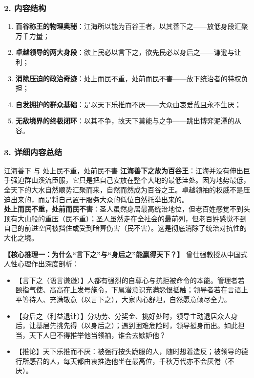 \subsubsection{2. 内容结构}
\begin{enumerate}
    \item \textbf{百谷称王的物理奥秘}：江海所以能为百谷王者，以其善下之——放低身段汇聚万千力量；
    \item \textbf{卓越领导的两大身段}：欲上民必以言下之，欲先民必以身后之——谦逊与让利；
    \item \textbf{消除压迫的政治奇迹}：处上而民不重，处前而民不害——放下统治者的特权负担；
    \item \textbf{自发拥护的群众基础}：是以天下乐推而不厌——大众由衷爱戴且永不生厌；
    \item \textbf{无敌境界的终极闭环}：以其不争，故天下莫能与之争——跳出博弈泥潭的从容。
\end{enumerate}

\subsubsection{3. 详细内容总结}

\begin{ConceptBox}{江海善下 与 处上民不重，处前民不害}
\textbf{江海善下之故为百谷王}：江海并没有伸出巨手强迫群山溪流臣服，它只是把自己安放在整个大地的最低洼处。因为地势最低，全天下的大水自然顺势汇聚而来，自然而然成为百谷之王。卓越领袖的权威不是压迫出来的，而是将自己置于服务大众的低位自然托举出来的。\\
\textbf{处上而民不重，处前而民不害}：圣人虽然身居最高统治地位，但老百姓感觉不到头顶有大山般的重压（民不重）；圣人虽然走在全社会的最前列，但老百姓感觉不到自己的前进空间被挡住或受到暗算伤害（民不害）。这是彻底消除了统治对抗性的大化之境。
\end{ConceptBox}

\noindent\textbf{【核心推理一：为什么“言下之”与“身后之”能赢得天下？】}
曾仕强教授从中国式人性心理作出深度剖析：
\begin{itemize}
    \item 【言下之（语言谦逊）】人都有强烈的自尊心与抗拒被命令的本能。管理者若颐指气使、高高在上发号施令，下属潜意识充满怨恨抵触；领导者若在言语上平等待人、充满敬意（以言下之），大家内心舒坦，自然愿意倾尽全力。
    \item 【身后之（利益退让）】分功劳、分奖金、挑好处时，领导主动退居众人身后，让基层先挑先得（以身后之）；遇到困难危险时，领导挺身而出。如此担当，天下人巴不得推举他当领袖，谁会去嫉妒他？
    \item 【推论】天下乐推而不厌：被强行按头跪服的人，随时想着造反；被领导的德行所感召的人，每天都由衷推选他坐在最高位，千秋万代亦不会厌倦（不厌）。
\end{itemize}

